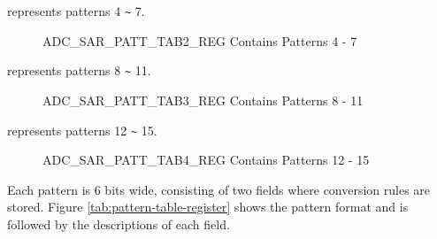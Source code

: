 \documentclass[main\_\_EN.tex]{subfiles}
\begin{document}
%
%
%
%
%
\begin{regdesc}\begin{reglist}
\item [cmd \regindex{n} (\regindex{n} = 4 - 7)] represents patterns 4 \verb+~+ 7.
\end{reglist}\end{regdesc}
\vspace{-2em}
\begin{figure}[H]
    \centering
    \caption{ADC\_SAR\_PATT\_TAB2\_REG Contains Patterns 4 - 7}
    \label{fig:pattern-tab-2}
\end{figure}

%
%
%
%
%
\begin{regdesc}\begin{reglist}
\item [cmd \regindex{n} (\regindex{n} = 8 - 11)] represents patterns 8 \verb+~+ 11.
\end{reglist}\end{regdesc}
\vspace{-2em}
\begin{figure}[H]
    \centering
    \caption{ADC\_SAR\_PATT\_TAB3\_REG Contains Patterns 8 - 11}
    \label{fig:pattern-tab-3}
\end{figure}

%
%
%
%
%
\begin{regdesc}\begin{reglist}
\item [cmd \regindex{n} (\regindex{n} = 12 - 15)] represents patterns 12 \verb+~+ 15.
\end{reglist}\end{regdesc}
\vspace{-2em}
\begin{figure}[H]
    \centering
    \caption{ADC\_SAR\_PATT\_TAB4\_REG Contains Patterns 12 - 15}
    \label{fig:pattern-tab-4}
\end{figure}
\vspace{-2em}
Each pattern is 6 bits wide, consisting of two fields where conversion rules are stored. Figure  \ref{tab:pattern-table-register} shows the pattern format and is followed by the descriptions of each field.
\end{document}
